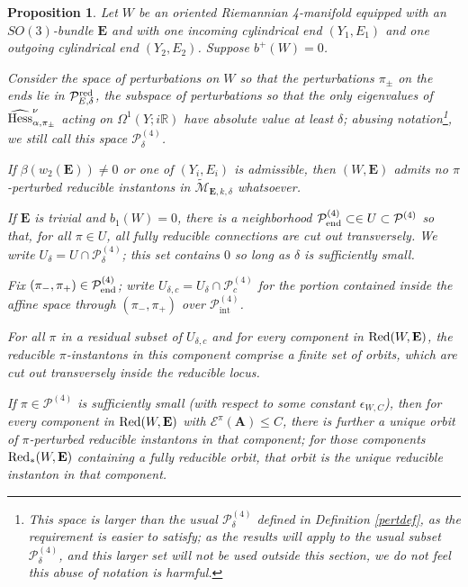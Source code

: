 \documentclass[10pt,a4paper]{amsart}
\newtheorem{proposition}[theorem]{Proposition}
\theoremstyle{definition}
\theoremstyle{remark}
\numberwithin{figure}{qchap}
\begin{document}
\begin{proposition}\label{red-solutions-nobplus}Let $W$ be an oriented Riemannian 4-manifold equipped with an $SO(3)$-bundle $\mathbf{E}$ and with one incoming cylindrical end $(Y_1,E_1)$ and one outgoing cylindrical end $(Y_2, E_2)$. Suppose $b^+(W) = 0$.

Consider the space of perturbations on $W$ so that the perturbations $\pi_\pm$ on the ends lie in $\mathcal P^{\textup{red}}_{E,\delta}$, the subspace of perturbations so that the only eigenvalues of $\widehat{\textup{Hess}}^\nu_{\alpha, \pi_\pm}$ acting on $\Omega^1(Y;i\mathbb R)$ have absolute value at least $\delta$; abusing notation\footnote{This space is larger than the usual $\mathcal P^{(4)}_\delta$ defined in Definition \ref{pertdef}, as the requirement is easier to satisfy; as the results will apply to the usual subset $\mathcal P^{(4)}_\delta$, and this larger set will not be used outside this section, we do not feel this abuse of notation is harmful.}, we still call this space $\mathcal P^{(4)}_\delta$.

If $\beta(w_2(\mathbf{E})) \neq 0$ or one of $(Y_i, E_i)$ is admissible, then $(W,\mathbf{E})$ admits no $\pi$-perturbed reducible instantons in $\widetilde{\mathcal M}_{\mathbf{E},k,\delta}$ whatsoever.

If $\mathbf{E}$ is trivial and $b_1(W) = 0$, there is a neighborhood $\mathcal P^{(4)}_{\textup{end}} \subset \in U \subset \mathcal P^{(4)}$ so that, for all $\pi \in U$, all fully reducible connections are cut out transversely. We write $U_\delta = U \cap \mathcal P^{(4)}_\delta$; this set contains $0$ so long as $\delta$ is sufficiently small. 

Fix $(\pi_-, \pi_+) \in \mathcal P^{(4)}_{\textup{end}}$; write $U_{\delta, c} = U_\delta \cap \mathcal P^{(4)}_c$ for the portion contained inside the affine space through $(\pi_-, \pi_+)$ over $\mathcal P^{(4)}_{\text{int}}$. 

For all $\pi$ in a residual subset of $U_{\delta,c}$ and for every component in $\textup{Red}(W,\mathbf{E})$, the reducible $\pi$-instantons in this component comprise a finite set of orbits, which are cut out transversely inside the reducible locus. 

If $\pi\in \mathcal P^{(4)}$ is sufficiently small (with respect to some constant $\epsilon_{W,C}$), then for every component in $\textup{Red}(W,\mathbf{E})$ with $\mathcal E^\pi(\mathbf{A}) \leq C$, there is further a unique orbit of $\pi$-perturbed reducible instantons in that component; for those components $\textup{Red}_*(W,\mathbf{E})$ containing a fully reducible orbit, that orbit is the unique reducible instanton in that component.
\end{proposition}
\end{document}

